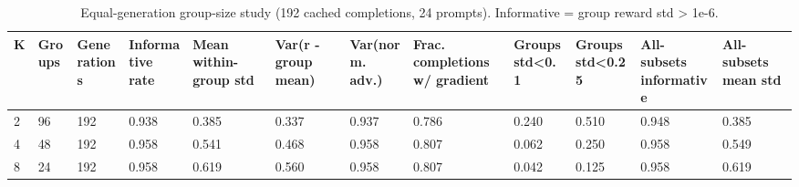 \begin{table}[t]
\centering
\small
\caption{Equal-generation group-size study (192 cached completions, 24 prompts). Informative = group reward std > 1e-6.}
\begin{tabular}{llllllllllll}
\toprule
K & Groups & Generations & Informative rate & Mean within-group std & Var(r - group mean) & Var(norm. adv.) & Frac. completions w/ gradient & Groups std<0.1 & Groups std<0.25 & All-subsets informative & All-subsets mean std \\
\midrule
2 & 96 & 192 & 0.938 & 0.385 & 0.337 & 0.937 & 0.786 & 0.240 & 0.510 & 0.948 & 0.385 \\
4 & 48 & 192 & 0.958 & 0.541 & 0.468 & 0.958 & 0.807 & 0.062 & 0.250 & 0.958 & 0.549 \\
8 & 24 & 192 & 0.958 & 0.619 & 0.560 & 0.958 & 0.807 & 0.042 & 0.125 & 0.958 & 0.619 \\
\bottomrule
\end{tabular}
\end{table}
